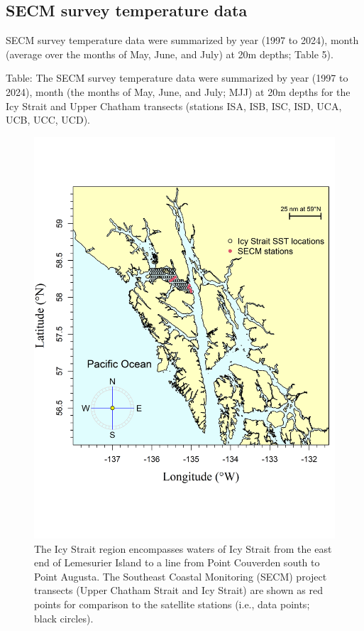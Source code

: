 \documentclass[
]{article}
\begin{document}
\pagebreak

\subsection{SECM survey temperature
data}\label{secm-survey-temperature-data-1}

SECM survey temperature data were summarized by year (1997 to 2024),
month (average over the months of May, June, and July) at 20m depths;
Table 5).

Table: The SECM survey temperature data were summarized by year (1997 to
2024), month (the months of May, June, and July; MJJ) at 20m depths for
the Icy Strait and Upper Chatham transects (stations ISA, ISB, ISC, ISD,
UCA, UCB, UCC, UCD).

\begin{figure}
\centering
\includegraphics{../../2024_forecast/results/temperature_data/Icy_Strait.png}
\caption{The Icy Strait region encompasses waters of Icy Strait from the
east end of Lemesurier Island to a line from Point Couverden south to
Point Augusta. The Southeast Coastal Monitoring (SECM) project transects
(Upper Chatham Strait and Icy Strait) are shown as red points for
comparison to the satellite stations (i.e., data points; black
circles).}
\end{figure}
\end{document}
